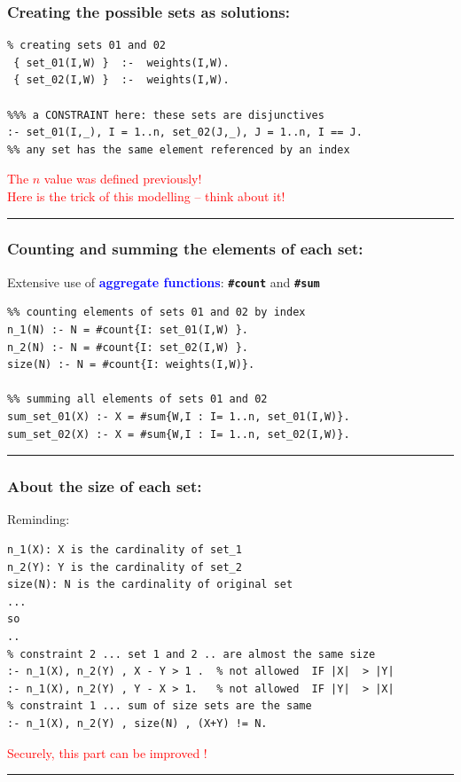 \documentclass{beamer}
\begin{document}

\begin{frame}[fragile] 
	\frametitle{Creating the possible sets as solutions:}
	

	
{\small
\begin{verbatim}
% creating sets 01 and 02
 { set_01(I,W) }  :-  weights(I,W).
 { set_02(I,W) }  :-  weights(I,W).

%%% a CONSTRAINT here: these sets are disjunctives
:- set_01(I,_), I = 1..n, set_02(J,_), J = 1..n, I == J.
%% any set has the same element referenced by an index

\end{verbatim}
}	
\textcolor{red}{The $n$ value was defined previously!}\\
\textcolor{red}{Here is the trick of this modelling -- think about it!}\\
\textcolor{red}{\rule{\textwidth}{1.7pt} } 
\end{frame}


\begin{frame}[fragile] 
	\frametitle{Counting and summing the elements of each set:}
	
	Extensive use of \textcolor{blue}{{\bf aggregate functions}}: {\bf \texttt{\#count}} and {\bf \texttt{\#sum}}
	
{\small
\begin{verbatim}
%% counting elements of sets 01 and 02 by index
n_1(N) :- N = #count{I: set_01(I,W) }.
n_2(N) :- N = #count{I: set_02(I,W) }.
size(N) :- N = #count{I: weights(I,W)}.

%% summing all elements of sets 01 and 02
sum_set_01(X) :- X = #sum{W,I : I= 1..n, set_01(I,W)}.
sum_set_02(X) :- X = #sum{W,I : I= 1..n, set_02(I,W)}.
\end{verbatim}
}	
\textcolor{red}{\rule{\textwidth}{1.7pt} } 
\end{frame}



\begin{frame}[fragile]
	\frametitle{About the size of each set:}

Reminding:
{\small
\begin{verbatim}
n_1(X): X is the cardinality of set_1 
n_2(Y): Y is the cardinality of set_2 
size(N): N is the cardinality of original set
...
so
..
% constraint 2 ... set 1 and 2 .. are almost the same size
:- n_1(X), n_2(Y) , X - Y > 1 .  % not allowed  IF |X|  > |Y|  
:- n_1(X), n_2(Y) , Y - X > 1.   % not allowed  IF |Y|  > |X|
% constraint 1 ... sum of size sets are the same
:- n_1(X), n_2(Y) , size(N) , (X+Y) != N.

\end{verbatim}
}	
\textcolor{red}{Securely, this part can be improved !}\\
\textcolor{red}{\rule{\textwidth}{1.7pt} } 
\end{frame}
\end{document}
